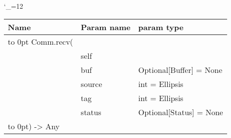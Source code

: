 \begingroup \catcode`\_=12 \tt
\begin{tabular}{lll}
\toprule
\textrm{Name}&\textrm{Param name}&\textrm{param type}\\
\midrule
\hbox to 0pt {Comm.recv(\hss}\\
& self\\
& buf & Optional[Buffer] = None\\
& source & int = Ellipsis\\
& tag & int = Ellipsis\\
& status & Optional[Status] = None\\
\hbox to 0pt{) -> Any\hss}\\
\bottomrule
\end{tabular}
\endgroup

